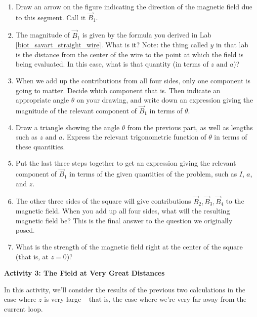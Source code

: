 \begin{enumerate}[wide, label=(\emph{\alph*})]

\item Draw an arrow on the figure indicating the 
direction of the magnetic field due to this segment.
Call it $\vec{B}_1$.

\item The magnitude of $\vec{B}_1$ is given by the formula
you derived in Lab \ref{biot_savart_straight_wire}. What is it? Note: the thing
called $y$ in that lab is the distance from the center of
the wire to the point at which the field is being evaluated. 
In this case, what is that quantity (in terms of $z$ and $a$)?
\answerspace{0.7in}

\item When we add up the contributions from all four sides, only
one component is going to matter.  Decide which
component that is. Then indicate an
appropriate angle $\theta$ on your drawing, and 
write down an expression giving
the magnitude of the relevant component of $\vec{B}_1$ in terms of $\theta$.  
\answerspace{0.7in}

\item Draw a triangle showing the angle $\theta$ from the previous part,
as well as lengths such as $z$ and $a$.  Express the relevant trigonometric
function of $\theta$ in terms of these quantities.
\answerspace{0.7in}

\item Put the last three steps together to get an expression giving the
relevant component of $\vec{B}_1$ in terms of the given quantities of the
problem, such as $I$, $a$, and $z$.  
\answerspace{0.7in}

\item \label{answer2}
The other three sides of the square will give contributions
$\vec{B}_2,\vec{B}_3,\vec{B}_4$ to the magnetic field.  When you add
up all four sides, what will the resulting magnetic field be?
This is the final answer to the question we originally posed.
\answerspace{0.7in}

\item What is the strength of the magnetic field right at the
center of the square (that is, at $z=0$)?
\answerspace{0.7in}

\end{enumerate}

\pagebreak[2]
\textbf{Activity 3: The Field at Very Great Distances}

In this activity, we'll consider the results of the previous
two calculations in the case where $z$ is very large -- that is,
the case where we're very far away from the current loop.

